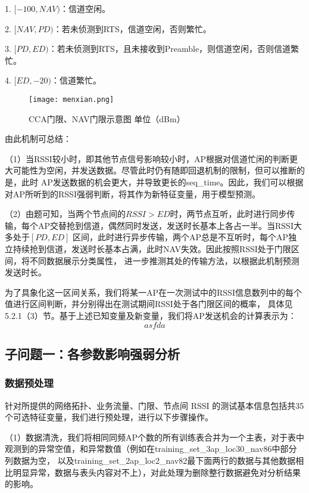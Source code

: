 \documentclass[bwprint]{gmcmthesis}
\begin{document}
 1. $ [ -100,NAV ) $：信道空闲。

 2. $ [ NAV,PD ) $：若未侦测到RTS，信道空闲，否则繁忙。

 3. $ [ PD,ED ) $：若未侦测到RTS，且未接收到Preamble，则信道空闲，否则信道繁忙。

 4. $ [ ED,-20 ) $：信道繁忙。
    

\begin{figure}[!htbp]
    \centering
    \texttt{[image: menxian.png]}
    \caption{\centering CCA门限、NAV门限示意图 \quad 单位（dBm）}
    \label{pho:menxian}
\end{figure}

由此机制可总结：

（1）当RSSI较小时，即其他节点信号影响较小时，AP根据对信道忙闲的判断更大可能性为空闲，并发送数据。尽管此时仍有随即回退机制的限制，但可以推断的是，此时
AP发送数据的机会更大，并导致更长的seq\_time。因此，我们可以根据对AP所听到的RSSI强弱判断，将其作为新特征变量，用于模型预测。

（2）由题可知，当两个节点间的$RSSI>ED$时，两节点互听，此时进行同步传输，每个AP交替抢到信道，偶然同时发送，发送时长基本上各占一半。当RSSI大多处于$[PD, ED]$
区间，此时进行异步传输，两个AP总是不互听时，每个AP独立持续抢到信道，发送时长基本占满，此时NAV失效。因此按照RSSI处于门限区间，将不同数据展示分类属性，
进一步推测其处的传输方法，以根据此机制预测发送时长。

为了具象化这一区间关系，我们将某一AP在一次测试中的RSSI信息数列中的每个值进行区间判断，并分别得出在测试期间RSSI处于各门限区间的概率，
具体见5.2.1（3）节。基于上述已知变量及新变量，我们将AP发送机会的计算表示为：$$asfda$$

\subsection{子问题一：各参数影响强弱分析}
\subsubsection{数据预处理}
针对所提供的网络拓扑、业务流量、门限、节点间 RSSI 的测试基本信息包括共35个可选特征变量，我们进行预处理，进行以下步骤操作。

（1）数据清洗，我们将相同同频AP个数的所有训练表合并为一个主表，对于表中观测到的异常空值，和异常数值（例如在training\_set\_3ap\_loc30\_nav86中部分列数据为空， 以及training\_set\_2ap\_loc2\_nav82最下面两行的数据与其他数据相比明显异常，数据与表头内容对不上），对此处理为删除整行数据避免对分析结果的影响。
\end{document}
